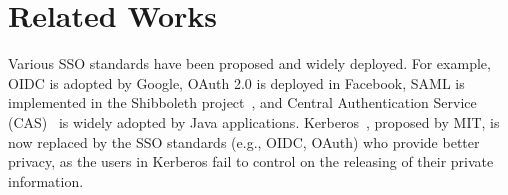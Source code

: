 \section{Related Works}%
\label{sec:related}
Various SSO  standards have been proposed and widely deployed. For example, OIDC is adopted by Google, OAuth 2.0 is deployed in Facebook, SAML is implemented in the Shibboleth project~\cite{Shibboleth}, and Central Authentication Service (CAS)~\cite{aubry2004esup} is widely adopted by Java applications. 
Kerberos~\cite{Kerberos}, proposed by MIT, is now replaced by the SSO standards (e.g., OIDC, OAuth) who provide better privacy, as the users in Kerberos fail to control on the releasing of their private information.

